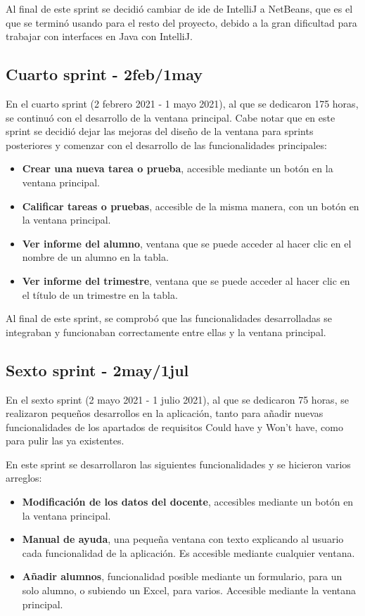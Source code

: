 Al final de este sprint se decidió cambiar de \gls{ide} de IntelliJ a NetBeans, que es el que se terminó usando para el resto del proyecto, debido a la gran dificultad para trabajar con interfaces en Java con IntelliJ.

\subsection{Cuarto sprint - 2feb/1may}

En el cuarto sprint (2 febrero 2021 - 1 mayo 2021), al que se dedicaron 175 horas, se continuó con el desarrollo de la ventana principal. Cabe notar que en este sprint se decidió dejar las mejoras del diseño de la ventana para sprints posteriores y comenzar con el desarrollo de las funcionalidades principales:
\begin{itemize}
	\item \textbf{Crear una nueva tarea o prueba}, accesible mediante un botón en la ventana principal.
	\item \textbf{Calificar tareas o pruebas}, accesible de la misma manera, con un botón en la ventana principal.
	\item \textbf{Ver informe del alumno}, ventana que se puede acceder al hacer clic en el nombre de un alumno en la tabla.
	\item \textbf{Ver informe del trimestre}, ventana que se puede acceder al hacer clic en el título de un trimestre en la tabla.
\end{itemize}


Al final de este sprint, se comprobó que las funcionalidades desarrolladas se integraban y funcionaban correctamente entre ellas y la ventana principal.

\subsection{Sexto sprint - 2may/1jul}

En el sexto sprint (2 mayo 2021 - 1 julio 2021), al que se dedicaron 75 horas, se realizaron pequeños desarrollos en la aplicación, tanto para añadir nuevas funcionalidades de los apartados de requisitos Could have y Won't have, como para pulir las ya existentes.

En este sprint se desarrollaron las siguientes funcionalidades y se hicieron varios arreglos:
\begin{itemize}
	\item \textbf{Modificación de los datos del docente}, accesibles mediante un botón en la ventana principal.
	\item \textbf{Manual de ayuda}, una pequeña ventana con texto explicando al usuario cada funcionalidad de la aplicación. Es accesible mediante cualquier ventana.
	\item \textbf{Añadir alumnos}, funcionalidad posible mediante un formulario, para un solo alumno, o subiendo un Excel, para varios. Accesible mediante la ventana principal.	
\end{itemize}

